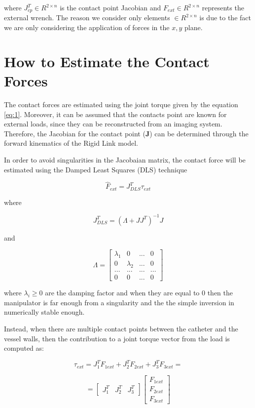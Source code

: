 \documentclass[conference,12pt]{IEEEtran}
\begin{document}
where $J_{cp}^T \in R^{2 \times n}$ is the contact point Jacobian and $F_{ext} \in R^{2 \times n}$ represents the external wrench. The reason we consider only elements $\in R^{2 \times n}$ is due to the fact we are only considering the application of forces in the $x,y$ plane.

\section{How to Estimate the Contact Forces}

The contact forces are estimated using the joint torque given by the equation \ref{eq:1}. Moreover, it can be assumed that the contacts point are known for external loads, since they can be reconstructed from an imaging system. Therefore, the Jacobian for the contact point (\textbf{J}) can be determined through the forward kinematics of the Rigid Link model. 

In order to avoid singularities in the Jacobaian matrix, the contact force will be
estimated using the Damped Least Squares (DLS) technique

\[\hat{F}_{ext}=J_{DLS}^T\tau_{ext}\]

where 

\[J_{DLS}^T=(\Lambda+JJ^T)^{-1}J\]

and

\[\Lambda=\begin{bmatrix}
\lambda_1 & 0 & ... & 0 \\
0 & \lambda_2 & ... & 0 \\
... & ... & ... & ... \\
0 & 0 & ... & 0
\end{bmatrix}\]

where $\lambda_i\geq0$ are the damping factor and when they are equal to 0 then the manipulator is far enough from a singularity and the the simple inversion in numerically stable enough.

Instead, when there are multiple contact points between the catheter and the vessel walls, then the contribution to a joint torque vector from the load is computed as:

\[\tau_{ext}=J_1^TF_{1ext} + J_2^TF_{2ext} + J_3^TF_{3ext} = \]

\[ = \begin{bmatrix}
J_1^T & J_2^T & J_3^T
\end{bmatrix}\begin{bmatrix}
F_{1ext}\\
F_{2ext}\\
F_{3ext}
\end{bmatrix} \]
\end{document}
